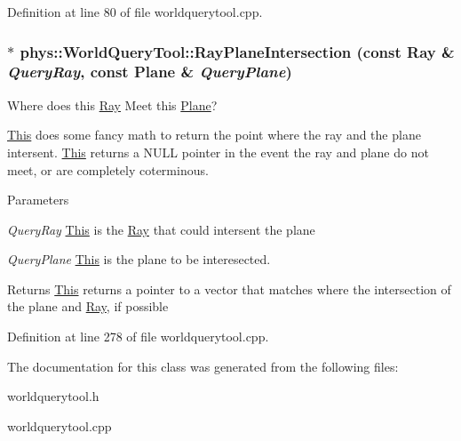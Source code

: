 Definition at line 80 of file worldquerytool.cpp.

\hypertarget{classphys_1_1WorldQueryTool_adfc5ea4a115ad8bb716dea87d8419e6f}{
\subsubsection[{RayPlaneIntersection}]{ $\ast$ phys::WorldQueryTool::RayPlaneIntersection (const {\bf Ray} \& {\em QueryRay}, \/  const {\bf Plane} \& {\em QueryPlane})}}
\label{d8/d69/classphys_1_1WorldQueryTool_adfc5ea4a115ad8bb716dea87d8419e6f}


Where does this \hyperlink{classphys_1_1Ray}{Ray} Meet this \hyperlink{classphys_1_1Plane}{Plane}? 

\hyperlink{structThis}{This} does some fancy math to return the point where the ray and the plane intersent. \hyperlink{structThis}{This} returns a NULL pointer in the event the ray and plane do not meet, or are completely coterminous. 
\begin{DoxyParams}{Parameters}
\item[{\em QueryRay}]\hyperlink{structThis}{This} is the \hyperlink{classphys_1_1Ray}{Ray} that could intersent the plane \item[{\em QueryPlane}]\hyperlink{structThis}{This} is the plane to be interesected. \end{DoxyParams}
\begin{DoxyReturn}{Returns}
\hyperlink{structThis}{This} returns a pointer to a vector that matches where the intersection of the plane and \hyperlink{classphys_1_1Ray}{Ray}, if possible 
\end{DoxyReturn}


Definition at line 278 of file worldquerytool.cpp.



The documentation for this class was generated from the following files:\begin{DoxyCompactItemize}
\item 
worldquerytool.h\item 
worldquerytool.cpp\end{DoxyCompactItemize}
